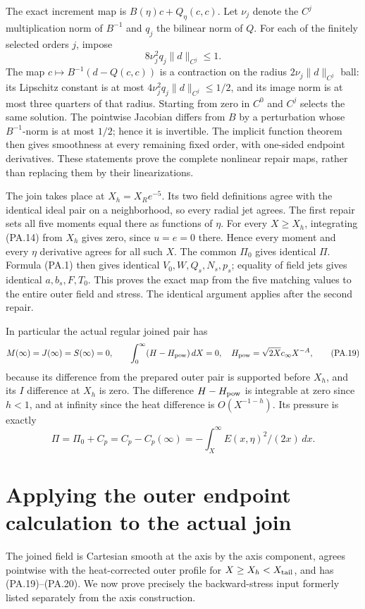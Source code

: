\documentclass[10pt,a4paper]{article}
\begin{document}
The exact increment map is $B(\eta)c+Q_\eta(c,c)$. Let $\nu_j$ denote
the $C^j$ multiplication norm of $B^{-1}$ and $q_j$ the bilinear norm of $Q$.
For each of the finitely selected orders $j$, impose
\[
 8\nu_j^2q_j\|d\|_{C^j}\le1.                                  \tag{PA.18}
\]
The map $c\mapsto B^{-1}(d-Q(c,c))$ is a contraction on the radius
$2\nu_j\|d\|_{C^j}$ ball: its Lipschitz constant is at most
$4\nu_j^2q_j\|d\|_{C^j}\le1/2$, and its image norm is at most
three quarters of that radius. Starting from zero in $C^0$ and $C^j$ selects
the same solution. The pointwise Jacobian differs from $B$ by a perturbation
whose $B^{-1}$-norm is at most $1/2$; hence it is invertible. The implicit
function theorem then gives smoothness at every remaining fixed order, with
one-sided endpoint derivatives. These statements prove the complete nonlinear
repair maps, rather than replacing them by their linearizations.

The join takes place at $X_h=X_Re^{-5}$. Its two field definitions agree with
the identical ideal pair on a neighborhood, so every radial jet agrees. The
first repair sets all five moments equal there as functions of $\eta$.
For every $X\ge X_h$, integrating (PA.14) from $X_h$ gives zero, since $u=e=0$
there. Hence every moment and every $\eta$ derivative agrees for all such $X$.
The common $\Pi_0$ gives identical $\Pi$. Formula (PA.1) then gives identical
$V_0,W,Q_s,N_s,p_s$; equality of field jets gives identical $a,b_s,F,T_0$.
This proves the exact map from the five matching values to the entire outer
field and stress. The identical argument applies after the second repair.

In particular the actual regular joined pair has
\[
 M(\infty)=J(\infty)=S(\infty)=0,\qquad
 \int_0^\infty(H-H_{\rm pow})\,dX=0,\quad
 H_{\rm pow}=\sqrt{2X}c_\infty X^{-A},                           \tag{PA.19}
\]
because its difference from the prepared outer pair is supported before $X_h$,
and its $I$ difference at $X_h$ is zero. The difference $H-H_{\rm pow}$ is
integrable at zero since $h<1$, and at infinity since the heat difference is
$O(X^{-1-h})$. Its pressure is exactly
\[
 \Pi=\Pi_0+C_p=C_p-C_p(\infty)
     =-\int_X^\infty E(x,\eta)^2/(2x)\,dx.                    \tag{PA.20}
\]

\section{Applying the outer endpoint calculation to the actual join}
The joined field is Cartesian smooth at the axis by the axis component, agrees
pointwise with the heat-corrected outer profile for $X\ge X_h<X_{\rm tail}$,
and has (PA.19)--(PA.20). We now prove precisely the backward-stress input formerly
listed separately from the axis construction.
\end{document}
